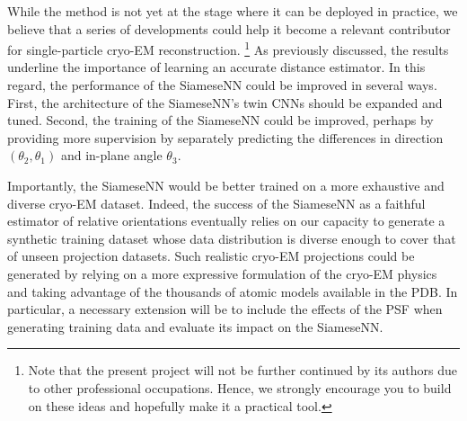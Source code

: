 While the method is not yet at the stage where it can be deployed in practice, we believe that a series of developments could help it become a relevant contributor for single-particle cryo-EM reconstruction.%
\footnote{Note that the present project will not be further continued by its authors due to other professional occupations. Hence, we strongly encourage you to build on these ideas and hopefully make it a practical tool.}
As previously discussed, the results underline the importance of learning an accurate distance estimator. %
In this regard, the performance of the SiameseNN could be improved in several ways.
First, the architecture of the SiameseNN's twin CNNs should be expanded and tuned.
Second, the training of the SiameseNN could be improved, perhaps by providing more supervision by separately predicting the differences in direction $(\theta_2,\theta_1)$ and in-plane angle $\theta_3$.

Importantly, the SiameseNN would be better trained on a more exhaustive and diverse cryo-EM dataset.
Indeed, the success of the SiameseNN as a faithful estimator of relative orientations eventually relies on our capacity to generate a synthetic training dataset whose data distribution is diverse enough to cover that of unseen projection datasets.
Such realistic cryo-EM projections could be generated by relying on a more expressive formulation of the cryo-EM physics and taking advantage of the thousands of atomic models available in the PDB\@.
In particular, a necessary extension will be to include the effects of the PSF when generating training data and evaluate its impact on the SiameseNN\@. %

